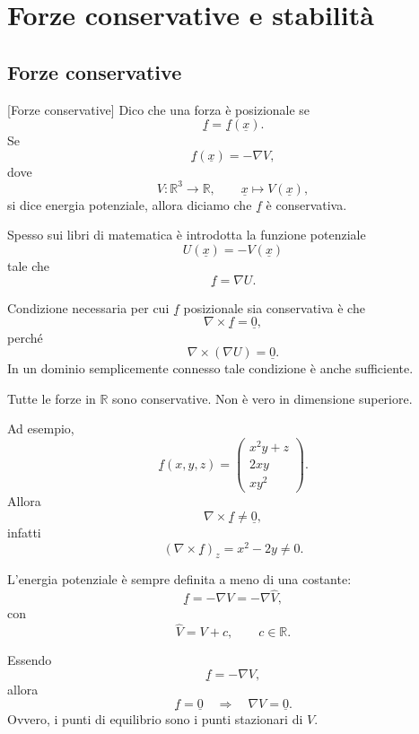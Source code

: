 \chapter{Forze conservative e stabilità}

\section{Forze conservative}
\begin{definition}{}[Forze conservative]
Dico che una forza è posizionale se
\[
\underline{f}=\underline{f}(\underline{x}).
\]
Se
\[
\underline{f}(\underline{x})=-\nabla V,
\]
dove
\[
V:\mathbb{R}^3\to\mathbb{R},
\qquad
\underline{x}\mapsto V(\underline{x}),
\]
si dice energia potenziale, allora diciamo che \(\underline{f}\) è conservativa.
\end{definition}

\begin{oss}{}
Spesso sui libri di matematica è introdotta la funzione potenziale
\[
U(\underline{x})=-V(\underline{x})
\]
tale che
\[
\underline{f}=\nabla U.
\]
\end{oss}
\inizioapprof
\begin{oss}{}
Condizione necessaria per cui \(\underline{f}\) posizionale sia conservativa è che
\[
\nabla\times \underline{f}=\underline{0},
\]
perché
\[
\nabla\times(\nabla U)=\underline{0}.
\]
In un dominio semplicemente connesso tale condizione è anche sufficiente.
\end{oss}

\begin{oss}{}
Tutte le forze in \(\mathbb{R}\) sono conservative. Non è vero in dimensione superiore.

Ad esempio,
\[
\underline{f}(x,y,z)
=
\begin{pmatrix}
x^2y+z\\
2xy\\
xy^2
\end{pmatrix}.
\]
Allora
\[
\nabla\times\underline{f}\neq \underline{0},
\]
infatti
\[
\left(\nabla\times\underline{f}\right)_z
=
x^2-2y\neq 0.
\]
\end{oss}
\fineapprof
\begin{oss}{}
L'energia potenziale è sempre definita a meno di una costante:
\[
\underline{f}
=
-\nabla V
=
-\nabla \hat{V},
\]
con
\[
\hat{V}=V+c,
\qquad c\in\mathbb{R}.
\]
\end{oss}

\begin{oss}{}
Essendo
\[
\underline{f}=-\nabla V,
\]
allora
\[
\underline{f}=\underline{0}
\quad\Longrightarrow\quad
\nabla V=\underline{0}.
\]
Ovvero, i punti di equilibrio sono i punti stazionari di \(V\).
\end{oss}

